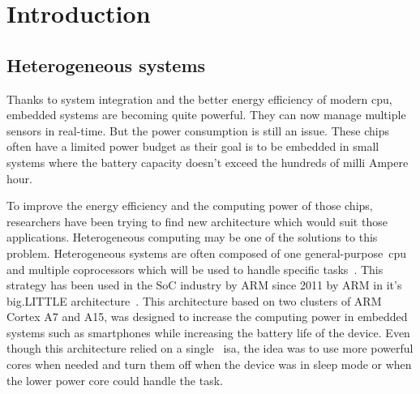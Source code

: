 
\chapter{Introduction}

\section{Heterogeneous systems}

    Thanks to system integration and the better energy efficiency of modern \gls{cpu}, embedded systems are becoming quite powerful. They can now manage multiple sensors in real-time. But the power consumption is still an issue. These chips often have a limited power budget as their goal is to be embedded in small systems where the battery capacity doesn't exceed the hundreds of milli Ampere hour. 


    To improve the energy efficiency and the computing power of those chips, researchers have been trying to find new architecture which would suit those applications. Heterogeneous computing may be one of the solutions to this problem. Heterogeneous systems are often composed of one general-purpose~\gls{cpu} and multiple coprocessors which will be used to handle specific tasks~\cite{Art:HeteroStrat}. This strategy has been used in the SoC industry by ARM since 2011 by ARM in it's big.LITTLE architecture~\cite{Art:bigLITTLE}. This architecture based on two clusters of ARM Cortex A7 and A15, was designed to increase the computing power in embedded systems such as smartphones while increasing the battery life of the device. Even though this architecture relied on a single~ \gls{isa}, the idea was to use more powerful cores when needed and turn them off when the device was in sleep mode or when the lower power core could handle the task. 


